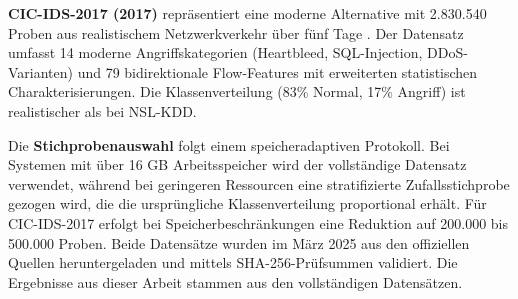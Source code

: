 \documentclass[11pt,a4paper]{article}
\begin{document}
    \textbf{CIC-IDS-2017 (2017)} repräsentiert eine moderne Alternative mit 2.830.540 Proben aus realistischem Netzwerkverkehr über fünf Tage \parencite{Sharafaldin2018}. Der Datensatz umfasst 14 moderne Angriffskategorien (Heartbleed, SQL-Injection, DDoS-Varianten) und 79 bidirektionale Flow-Features mit erweiterten statistischen Charakterisierungen. Die Klassenverteilung (83\% Normal, 17\% Angriff) ist realistischer als bei NSL-KDD.

    Die \textbf{Stichprobenauswahl} folgt einem speicheradaptiven Protokoll. Bei Systemen mit über 16 GB Arbeitsspeicher wird der vollständige Datensatz verwendet, während bei geringeren Ressourcen eine stratifizierte Zufallsstichprobe gezogen wird, die die ursprüngliche Klassenverteilung proportional erhält. Für CIC-IDS-2017 erfolgt bei Speicherbeschränkungen eine Reduktion auf 200.000 bis 500.000 Proben. Beide Datensätze wurden im März 2025 aus den offiziellen Quellen heruntergeladen \parencite{NSLKDD2024,CICIDS2017} und mittels SHA-256-Prüfsummen validiert. Die Ergebnisse aus dieser Arbeit stammen aus den vollständigen Datensätzen.
\end{document}
